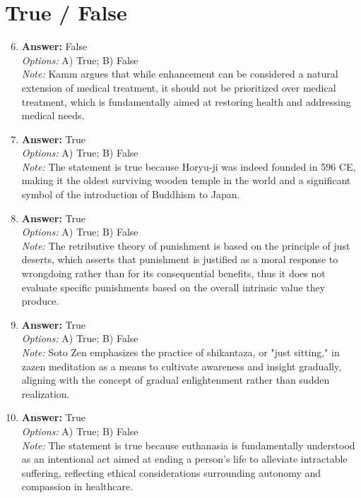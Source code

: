 \documentclass[12pt]{article}
\begin{document}
\section*{True / False}
\begin{enumerate}[label=\arabic*.]
\setcounter{enumi}{5}
\item \textbf{Answer:} False
\\ \textit{Options:} A) True; B) False
\\ \textit{Note:} Kamm argues that while enhancement can be considered a natural extension of medical treatment, it should not be prioritized over medical treatment, which is fundamentally aimed at restoring health and addressing medical needs.
\item \textbf{Answer:} True
\\ \textit{Options:} A) True; B) False
\\ \textit{Note:} The statement is true because Horyu-ji was indeed founded in 596 CE, making it the oldest surviving wooden temple in the world and a significant symbol of the introduction of Buddhism to Japan.
\item \textbf{Answer:} True
\\ \textit{Options:} A) True; B) False
\\ \textit{Note:} The retributive theory of punishment is based on the principle of just deserts, which asserts that punishment is justified as a moral response to wrongdoing rather than for its consequential benefits, thus it does not evaluate specific punishments based on the overall intrinsic value they produce.
\item \textbf{Answer:} True
\\ \textit{Options:} A) True; B) False
\\ \textit{Note:} Soto Zen emphasizes the practice of shikantaza, or "just sitting," in zazen meditation as a means to cultivate awareness and insight gradually, aligning with the concept of gradual enlightenment rather than sudden realization.
\item \textbf{Answer:} True
\\ \textit{Options:} A) True; B) False
\\ \textit{Note:} The statement is true because euthanasia is fundamentally understood as an intentional act aimed at ending a person's life to alleviate intractable suffering, reflecting ethical considerations surrounding autonomy and compassion in healthcare.
\end{enumerate}
\end{document}
